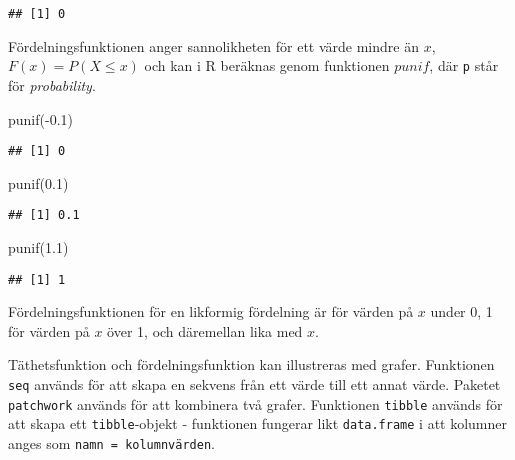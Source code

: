 \documentclass[
]{book}
\newenvironment{Shaded}{\begin{snugshade}}{\end{snugshade}}
\newcommand{\FloatTok}[1]{\textcolor[rgb]{0.00,0.00,0.81}{#1}}
\newcommand{\FunctionTok}[1]{\textcolor[rgb]{0.00,0.00,0.00}{#1}}
\newcommand{\NormalTok}[1]{#1}
\newcommand{\SpecialCharTok}[1]{\textcolor[rgb]{0.00,0.00,0.00}{#1}}
\theoremstyle{definition}
\theoremstyle{definition}
\theoremstyle{definition}
\theoremstyle{definition}
\theoremstyle{remark}
\begin{document}
\begin{verbatim}
## [1] 0
\end{verbatim}

Fördelningsfunktionen anger sannolikheten för ett värde mindre än \(x\), \(F(x) = P(X \leq x)\) och kan i R beräknas genom funktionen \(punif\), där \texttt{p} står för \emph{probability}.

\begin{Shaded}
\begin{Highlighting}[]
\FunctionTok{punif}\NormalTok{(}\SpecialCharTok{{-}}\FloatTok{0.1}\NormalTok{)}
\end{Highlighting}
\end{Shaded}

\begin{verbatim}
## [1] 0
\end{verbatim}

\begin{Shaded}
\begin{Highlighting}[]
\FunctionTok{punif}\NormalTok{(}\FloatTok{0.1}\NormalTok{)}
\end{Highlighting}
\end{Shaded}

\begin{verbatim}
## [1] 0.1
\end{verbatim}

\begin{Shaded}
\begin{Highlighting}[]
\FunctionTok{punif}\NormalTok{(}\FloatTok{1.1}\NormalTok{)}
\end{Highlighting}
\end{Shaded}

\begin{verbatim}
## [1] 1
\end{verbatim}

Fördelningsfunktionen för en likformig fördelning är för värden på \(x\) under 0, 1 för värden på \(x\) över 1, och däremellan lika med \(x\).

Täthetsfunktion och fördelningsfunktion kan illustreras med grafer. Funktionen \texttt{seq} används för att skapa en sekvens från ett värde till ett annat värde. Paketet \texttt{patchwork} används för att kombinera två grafer. Funktionen \texttt{tibble} används för att skapa ett \texttt{tibble}-objekt - funktionen fungerar likt \texttt{data.frame} i att kolumner anges som \texttt{namn\ =\ kolumnvärden}.
\end{document}
